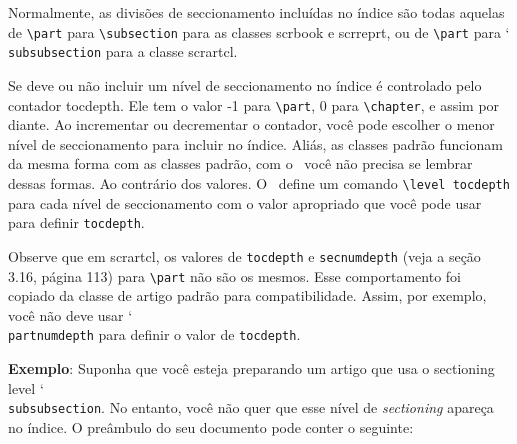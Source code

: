 Normalmente, as divisões de seccionamento incluídas no índice são todas aquelas de \verb|\part| para \verb|\subsection| para as classes scrbook e scrreprt, ou de \verb|\part| para \char`\\\texttt{sub\-sub\-sec\-tion} para a classe scrartcl.

Se deve ou não incluir um nível de seccionamento no índice é controlado pelo contador tocdepth. Ele tem o valor -1 para \verb|\part|, 0 para \verb|\chapter|, e assim por diante. Ao incrementar ou decrementar o contador, você pode escolher o menor nível  de seccionamento para incluir no índice. Aliás, as classes padrão funcionam da mesma forma com as classes padrão, com o \KOMAScript\ você não precisa se lembrar dessas formas. Ao contrário dos valores. O \KOMAScript\ define um comando \verb|\level tocdepth| para cada nível de seccionamento com o valor apropriado que você pode usar para definir \verb|tocdepth|.

Observe que em scrartcl, os valores de \verb|tocdepth| e \verb|secnumdepth| (veja a seção 3.16, página 113) para \verb|\part| não são os mesmos. Esse comportamento foi copiado da classe de artigo padrão para compatibilidade. Assim, por exemplo, você não deve usar \char`\\\texttt{part\-num\-depth} para definir o valor de \verb|tocdepth|.

\textbf{Exemplo}: Suponha que você esteja preparando um artigo que usa o sectioning level \char`\\\texttt{sub\-sub\-section}. No entanto, você não quer que esse nível de \textit{sectioning} apareça no índice. O preâmbulo do seu documento pode conter o seguinte:

